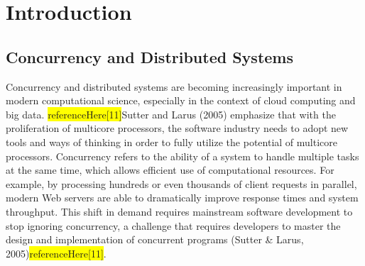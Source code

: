 \documentclass{l4proj}
\begin{document}
%
%
%
%
%
%
%
%
\chapter{Introduction}



\section{Concurrency and Distributed Systems}

Concurrency and distributed systems are becoming increasingly important in modern computational science, especially in the context of cloud computing and big data. \colorbox{yellow}{referenceHere[11]}Sutter and Larus (2005) emphasize that with the proliferation of multicore processors, the software industry needs to adopt new tools and ways of thinking in order to fully utilize the potential of multicore processors. Concurrency refers to the ability of a system to handle multiple tasks at the same time, which allows efficient use of computational resources. For example, by processing hundreds or even thousands of client requests in parallel, modern Web servers are able to dramatically improve response times and system throughput. This shift in demand requires mainstream software development to stop ignoring concurrency, a challenge that requires developers to master the design and implementation of concurrent programs (Sutter & Larus, 2005)\colorbox{yellow}{referenceHere[11]}.
    
\end{document}
